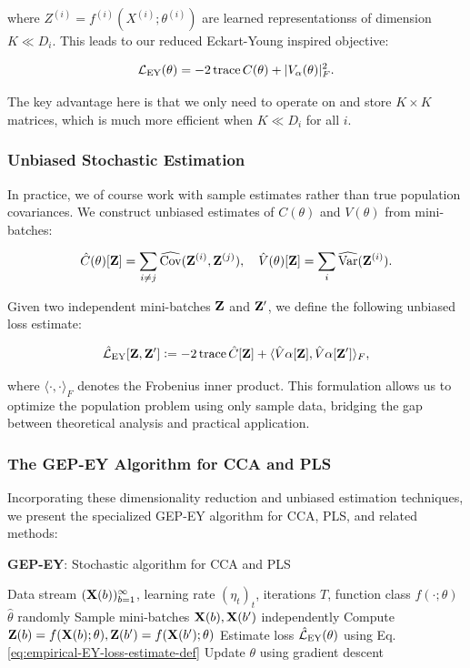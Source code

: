where $Z^{(i)} = f^{(i)}(X^{(i)}; \theta^{(i)})$ are learned \glspl{representations} of dimension $K \ll D_i$. This leads to our reduced Eckart-Young inspired objective:

\begin{align}\label{eq:EY-loss-def-C-V}
\mathcal{L}_\text{EY}(\theta) = -2 \operatorname{trace} C(\theta) + |V_\alpha(\theta)|_F^2.
\end{align}

The key advantage here is that we only need to operate on and store $K \times K$ matrices, which is much more efficient when $K \ll D_i$ for all $i$.

\subsubsection{Unbiased Stochastic Estimation}
In practice, we of course work with sample estimates rather than true population covariances. We construct unbiased estimates of $C(\theta)$ and $V(\theta)$ from mini-batches:

\begin{align}\label{eq:def-C-V-matrices-empirical}
\hat{C}(\theta)[\mathbf{Z}] = \sum_{i \neq j} \widehat{\mathrm{Cov}}(\mathbf{Z}^{(i)}, \mathbf{Z}^{(j)}), \quad
\hat{V}(\theta)[\mathbf{Z}] = \sum_{i} \widehat{\mathrm{Var}}(\mathbf{Z}^{(i)}).
\end{align}

Given two independent mini-batches $\mathbf{Z}$ and $\mathbf{Z}'$, we define the following unbiased loss estimate:

\begin{align}\label{eq:empirical-EY-loss-estimate-def}
\hat{\mathcal{L}}_\text{EY}[\mathbf{Z}, \mathbf{Z}'] \vcentcolon= - 2 \operatorname{trace} \hat{C}[\mathbf{Z}] + \langle \hat{V}\alpha[\mathbf{Z}], \hat{V}\alpha[\mathbf{Z}'] \rangle_F,
\end{align}

where $\langle \cdot, \cdot \rangle_F$ denotes the Frobenius inner product. This formulation allows us to optimize the population problem using only sample data, bridging the gap between theoretical analysis and practical application.
\subsubsection{The GEP-EY Algorithm for CCA and PLS}
Incorporating these dimensionality reduction and unbiased estimation techniques, we present the specialized GEP-EY algorithm for CCA, PLS, and related methods:

\begin{algorithm}
\caption{\textbf{GEP-EY}: Stochastic algorithm for CCA and PLS}
\label{alg:cca_pls}
\begin{algorithmic}
 Data stream $(\mathbf{X}(b))_{b=1}^\infty$, learning rate $(\eta_t)_t$, iterations $T$, function class $f(\cdot; \theta)$
 $\hat{\theta}$ randomly
\STATE Sample mini-batches $\mathbf{X}(b), \mathbf{X}(b')$ independently
\STATE Compute $\mathbf{Z}(b) = f(\mathbf{X}(b); \theta), \mathbf{Z}(b') = f(\mathbf{X}(b'); \theta)$
\STATE Estimate loss $\hat{\mathcal{L}}_\text{EY}(\theta)$ using Eq. \eqref{eq:empirical-EY-loss-estimate-def}
\STATE Update $\theta$ using gradient descent
\ENDFOR
\end{algorithmic}
\end{algorithm}

